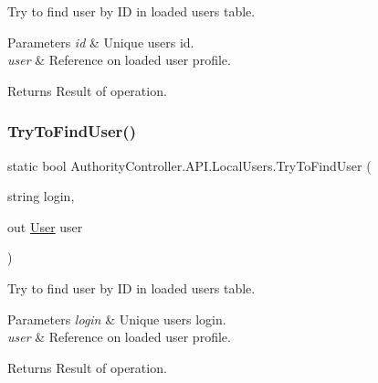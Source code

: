 Try to find user by ID in loaded users table. 


\begin{DoxyParams}{Parameters}
{\em id} & Unique user\textquotesingle{}s id.\\
\hline
{\em user} & Reference on loaded user profile.\\
\hline
\end{DoxyParams}
\begin{DoxyReturn}{Returns}
Result of operation.
\end{DoxyReturn}
\mbox{\label{class_authority_controller_1_1_a_p_i_1_1_local_users_af37939b7ade7b7be30f5ad8935cecdb3}} 
\subsubsection{\texorpdfstring{Try\+To\+Find\+User()}{TryToFindUser()}\hspace{0.1cm}{\footnotesize\ttfamily [2/2]}}
{\footnotesize\ttfamily static bool Authority\+Controller.\+A\+P\+I.\+Local\+Users.\+Try\+To\+Find\+User (\begin{DoxyParamCaption}\item[{string}]{login,  }\item[{out \mbox{\hyperlink{class_authority_controller_1_1_data_1_1_personal_1_1_user}{User}}}]{user }\end{DoxyParamCaption})\hspace{0.3cm}{\ttfamily [static]}}



Try to find user by ID in loaded users table. 


\begin{DoxyParams}{Parameters}
{\em login} & Unique user\textquotesingle{}s login.\\
\hline
{\em user} & Reference on loaded user profile.\\
\hline
\end{DoxyParams}
\begin{DoxyReturn}{Returns}
Result of operation.
\end{DoxyReturn}
\mbox{\label{class_authority_controller_1_1_a_p_i_1_1_local_users_a8bf53e0c8216de0a8f5244e11ccb90b5}} 
